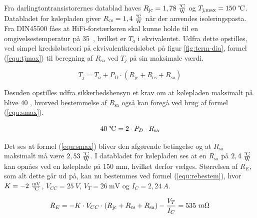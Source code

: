 Fra darlingtontransistorernes datablad haves $R_{\mathrm{jc}} = 1,78~\tfrac{\celsius}{\mathrm{W}}$ og $T_{\mathrm{j,max}} = 150~\celsius$. Databladet for kølepladen giver $R_{\mathrm{cs}} = 1,4~\tfrac{\celsius}{\mathrm{W}}$ når der anvendes isoleringspasta. Fra DIN45500  fåes at HiFi-forstærkeren skal kunne holde til en omgivelsestemperatur på 35~\celsius, hvilket er $T_a$ i ekvivalentet. Udfra dette opstilles, ved simpel kredsløbsteori på ekvivalentkredsløbet på figur \ref{fig:term-dia}, formel (\ref{equ:tjmax}) til beregning af $R_{\mathrm{sa}}$ ved $T_j$  på sin maksimale værdi. 

\begin{equation}
\label{equ:tjmax}
T_j = T_a + P_D \cdot (R_{\mathrm{jc}} + R_{\mathrm{cs}} + R_{\mathrm{sa}})
\end{equation}

Desuden opstilles udfra sikkerhedshensyn et krav om at kølepladen maksimalt på blive 40 \celsius, hvorved bestemmelse af $R_{\mathrm{sa}}$ også kan foregå ved brug af formel (\ref{equ:smax}). 

\begin{equation}
\label{equ:smax}
40~\celsius = 2 \cdot P_D \cdot R_{\mathrm{sa}}
\end{equation}

Det ses at formel (\ref{equ:smax}) bliver den afgørende betingelse og at $R_{\mathrm{sa}}$ maksimalt må være $2,53~\tfrac{\celsius}{\mathrm{W}}$. I databladet for kølepladen ses at en $R_{\mathrm{sa}}$ på $2,4~\tfrac{\celsius}{\mathrm{W}}$ kan opnåes ved en køleplade på 150 mm, hvilket derfor vælges. Størrelsen af $R_E$, som alt dette går ud på, kan nu bestemmes ved formel (\ref{equ:rebestem}), hvor $K = - 2~\tfrac{\mathrm{mV}}{\celsius}$, $V_{CC} = 25~V$, $V_T = 26~\mathrm{mV}$ og $I_C = 2,24~A$.

\begin{equation}
\label{equ:rebestem}
R_E = - K \cdot V_{CC} \cdot (R_{\mathrm{jc}} + R_{\mathrm{cs}} + R_{\mathrm{sa}}) - \frac{V_T}{I_C} = 535~m\ohm
\end{equation}
